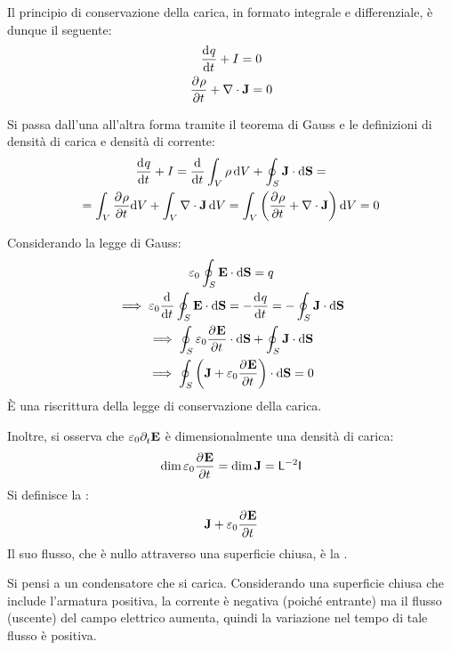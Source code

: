 Il principio di conservazione della carica, in formato integrale e differenziale, è dunque il seguente:
\begin{subequations}
\begin{gather}
    \der[q]{t} + I = 0 \\
    \parder[\rho]{t} + \diver \dcurr = 0
\end{gather}
\end{subequations}

Si passa dall'una all'altra forma tramite il teorema di Gauss e le definizioni di densità di carica e densità di corrente:
\begin{equation}
\begin{gathered}
    \der[q]{t} + I
    = \der{t} \int_V \rho \, \de V + \oint_S \dcurr \sde = \\
    = \int_V \parder[\rho]{t} \de V + \int_V \diver \dcurr \, \de V
    = \int_V \pts{\parder[\rho]{t} + \diver \dcurr} \de V
    = 0
\end{gathered}
\end{equation}

Considerando la legge di Gauss:
\begin{gather}
\begin{gathered}
    \eps_0 \oint_S \E \sde = q \\
    \implies
    \eps_0 \der{t} \oint_S \E \sde = -\der[q]{t} = -\oint_S \dcurr \sde \\
    \implies
    \oint_S \eps_0 \parder[\E]{t} \sde + \oint_S \dcurr \sde
\end{gathered} \\
\label{eq:flusso_corrente_generalizzata}
    \implies \oint_S \pts{\dcurr + \eps_0 \parder[\E]{t}} \sde = 0
\end{gather}
È una riscrittura della legge di conservazione della carica.

Inoltre, si osserva che $\eps_0 \parder[\E]{t}$ è dimensionalmente una densità di carica:
\begin{equation}
    \dimension \eps_0 \parder[\E]{t} = \dimension \dcurr = \mathsf{L}^{-2} \mathsf{I}
\end{equation}
Si definisce la :
\begin{equation}
    \dcurr + \eps_0 \parder[\E]{t}
\end{equation}
Il suo flusso, che è nullo attraverso una superficie chiusa, è la .

Si pensi a un condensatore che si carica.
Considerando una superficie chiusa che include l'armatura positiva, la corrente è negativa (poiché entrante) ma il flusso (uscente) del campo elettrico aumenta, quindi la variazione nel tempo di tale flusso è positiva.

